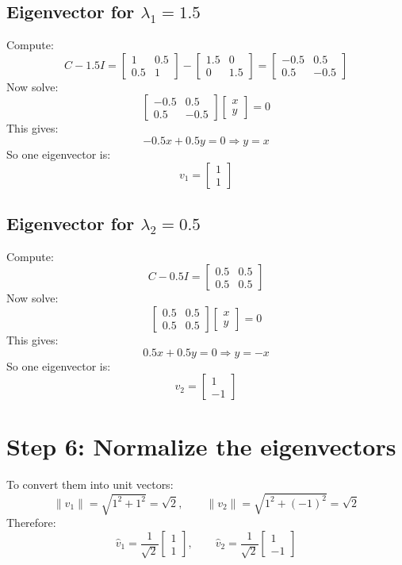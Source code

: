 \documentclass[11pt]{article}
\begin{document}
\subsection{Eigenvector for $\lambda_1 = 1.5$}
Compute:
\[
  C - 1.5I =
  \begin{bmatrix}
    1 & 0.5\\
    0.5 & 1
  \end{bmatrix}
  -
  \begin{bmatrix}
    1.5 & 0\\
    0 & 1.5
  \end{bmatrix}
  =
  \begin{bmatrix}
    -0.5 & 0.5\\
    0.5 & -0.5
  \end{bmatrix}
\]
Now solve:
\[
  \begin{bmatrix}
    -0.5 & 0.5\\
    0.5 & -0.5
  \end{bmatrix}
  \begin{bmatrix}
    x\\y
  \end{bmatrix}
  = 0
\]
This gives:
\[
  -0.5x + 0.5y = 0
  \Rightarrow y=x
\]
So one eigenvector is:
\[
  v_1 =
  \begin{bmatrix}
    1\\1
  \end{bmatrix}
\]

\subsection{Eigenvector for $\lambda_2 = 0.5$}
Compute:
\[
  C - 0.5I =
  \begin{bmatrix}
    0.5 & 0.5\\
    0.5 & 0.5
  \end{bmatrix}
\]
Now solve:
\[
  \begin{bmatrix}
    0.5 & 0.5\\
    0.5 & 0.5
  \end{bmatrix}
  \begin{bmatrix}
    x\\y
  \end{bmatrix}
  = 0
\]
This gives:
\[
  0.5x + 0.5y = 0
  \Rightarrow y=-x
\]
So one eigenvector is:
\[
  v_2 =
  \begin{bmatrix}
    1\\-1
  \end{bmatrix}
\]

\section{Step 6: Normalize the eigenvectors}
To convert them into unit vectors:
\[
  \|v_1\| = \sqrt{1^2 + 1^2} = \sqrt{2},
  \qquad
  \|v_2\| = \sqrt{1^2 + (-1)^2} = \sqrt{2}
\]
Therefore:
\[
  \hat v_1 =
  \frac{1}{\sqrt{2}}
  \begin{bmatrix}
    1\\1
  \end{bmatrix},
  \qquad
  \hat v_2 =
  \frac{1}{\sqrt{2}}
  \begin{bmatrix}
    1\\-1
  \end{bmatrix}
\]
\end{document}
